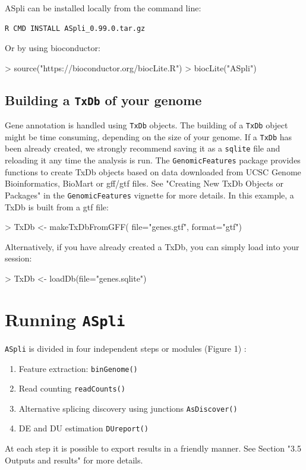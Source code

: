 \documentclass{article}
\begin{document}
ASpli can be installed locally from the command line:

\begin{verbatim}
R CMD INSTALL ASpli_0.99.0.tar.gz
\end{verbatim}

Or by using bioconductor:

\begin{Schunk}
\begin{Sinput}
> source("https://bioconductor.org/biocLite.R")
> biocLite("ASpli")
\end{Sinput}
\end{Schunk}

  
\subsection{Building a \texttt{TxDb} of your genome }
Gene annotation is handled using \texttt{TxDb} objects. The building of a \texttt{TxDb} object might be time consuming, depending on the size of your genome. If a \texttt{TxDb} has been already created, we strongly recommend  saving it as a \texttt{sqlite} file and reloading it any time the analysis is run.  The \texttt{GenomicFeatures} package provides functions to create TxDb objects based on data downloaded from UCSC Genome Bioinformatics, BioMart or gff/gtf files. See "Creating New TxDb Objects or Packages" in the \texttt{GenomicFeatures} vignette for more details. In this example, a TxDb is built from a gtf file:

\begin{Schunk}
\begin{Sinput}
> TxDb <- makeTxDbFromGFF(
   file="genes.gtf",
   format="gtf")
\end{Sinput}
\end{Schunk}
Alternatively, if you have already created a TxDb, you can simply load into your session:
\begin{Schunk}
\begin{Sinput}
> TxDb <- loadDb(file="genes.sqlite")
\end{Sinput}
\end{Schunk}


\section{Running \texttt{ASpli}}
\texttt{ASpli} is divided in four independent steps or modules (Figure 1) : 
\begin{enumerate}
  \item Feature extraction: \texttt{binGenome()}
  \item Read counting \texttt{readCounts()}
\item Alternative splicing discovery using junctions \texttt{AsDiscover()}
\item DE and DU estimation \texttt{DUreport()}
\end{enumerate}
At each step it is possible to export results in a friendly manner. See Section "3.5 Outputs and results" for more details.
\end{document}
